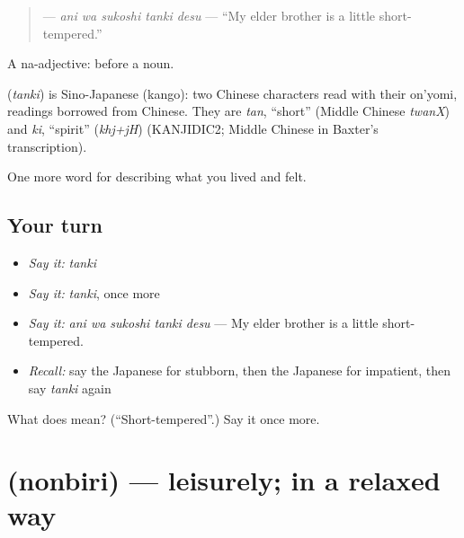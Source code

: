 \begin{quote}
\textbf{  } — \emph{ani wa sukoshi tanki desu} — \textquotedblleft{}My elder brother is a little short-tempered.\textquotedblright{}
\end{quote}

A na-adjective:  before a noun.

\begin{cousinweb}
\textbf{} (\emph{tanki}) is Sino-Japanese (kango): two Chinese characters read with their on'yomi, readings borrowed from Chinese. They are \emph{tan}, \textquotedblleft{}short\textquotedblright{} (Middle Chinese \emph{twanX}) and \emph{ki}, \textquotedblleft{}spirit\textquotedblright{} (\emph{khj+jH}) (KANJIDIC2; Middle Chinese in Baxter's transcription).
\end{cousinweb}

\begin{grammarlens}[title={What you've built}]
One more word for describing what you lived and felt.
\end{grammarlens}

\subsection*{Your turn}
\begin{itemize}
\raggedright
  \item \emph{Say it:} \emph{tanki}
  \item \emph{Say it:} \emph{tanki}, once more
  \item \emph{Say it:} \emph{ani wa sukoshi tanki desu} — My elder brother is a little short-tempered.
  \item \emph{Recall:} say the Japanese for stubborn, then the Japanese for impatient, then say \emph{tanki} again
\end{itemize}

\begin{tcolorbox}[breakable,colback=teal!4,colframe=teal!35!black,title={Before you move on}]
What does  mean? (\textquotedblleft{}Short-tempered\textquotedblright{}.) Say it once more.
\end{tcolorbox}
\section[\texorpdfstring{\ja{のんびり} (nonbiri)}{のんびり (nonbiri)}]{ (nonbiri) — leisurely; in a relaxed way}

\label{lesson:JA-C438-nonbiri}



